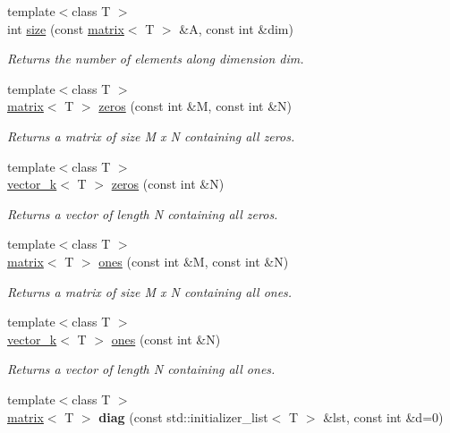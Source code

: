 \begin{DoxyCompactItemize}
\item 
{\footnotesize template$<$class T $>$ }\\int \hyperlink{namespacekeycpp_a2824156817719ffe96a842dd0ef27ae5}{size} (const \hyperlink{classkeycpp_1_1matrix}{matrix}$<$ T $>$ \&A, const int \&dim)
\begin{DoxyCompactList}\small\item\em Returns the number of elements along dimension dim. \end{DoxyCompactList}\item 
{\footnotesize template$<$class T $>$ }\\\hyperlink{classkeycpp_1_1matrix}{matrix}$<$ T $>$ \hyperlink{namespacekeycpp_a5699c522088657287bf0ac01173b716c}{zeros} (const int \&M, const int \&N)
\begin{DoxyCompactList}\small\item\em Returns a matrix of size M x N containing all zeros. \end{DoxyCompactList}\item 
{\footnotesize template$<$class T $>$ }\\\hyperlink{classkeycpp_1_1vector__k}{vector\-\_\-k}$<$ T $>$ \hyperlink{namespacekeycpp_ac00f5a8f1eba98722c1aac6b637a18c7}{zeros} (const int \&N)
\begin{DoxyCompactList}\small\item\em Returns a vector of length N containing all zeros. \end{DoxyCompactList}\item 
{\footnotesize template$<$class T $>$ }\\\hyperlink{classkeycpp_1_1matrix}{matrix}$<$ T $>$ \hyperlink{namespacekeycpp_a388f91a0ccf34978ef9403ccd0c680bf}{ones} (const int \&M, const int \&N)
\begin{DoxyCompactList}\small\item\em Returns a matrix of size M x N containing all ones. \end{DoxyCompactList}\item 
{\footnotesize template$<$class T $>$ }\\\hyperlink{classkeycpp_1_1vector__k}{vector\-\_\-k}$<$ T $>$ \hyperlink{namespacekeycpp_af40d69ddd09826dae133a479cff545b0}{ones} (const int \&N)
\begin{DoxyCompactList}\small\item\em Returns a vector of length N containing all ones. \end{DoxyCompactList}\item 
\hypertarget{namespacekeycpp_a4bb3ea9a842383b82c889179f25be9ec}{{\footnotesize template$<$class T $>$ }\\\hyperlink{classkeycpp_1_1matrix}{matrix}$<$ T $>$ {\bfseries diag} (const std\-::initializer\-\_\-list$<$ T $>$ \&lst, const int \&d=0)}\label{namespacekeycpp_a4bb3ea9a842383b82c889179f25be9ec}


\end{DoxyCompactItemize}
